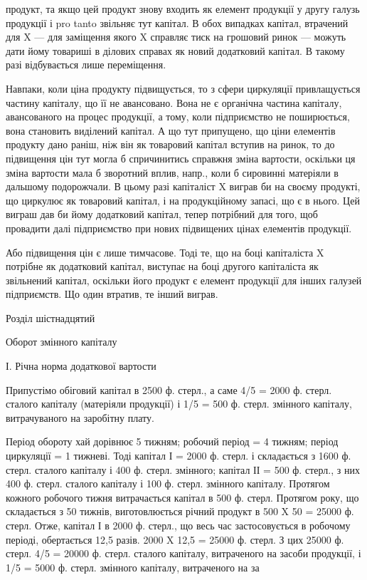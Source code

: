 продукт, та якщо цей продукт знову входить як елемент продукції у
другу галузь продукції і pro tanto звільняє тут капітал. В обох випадках
капітал, втрачений для X — для заміщення якого X справляє тиск на грошовий
ринок — можуть дати йому товариші в ділових справах як новий
додатковий капітал. В такому разі відбувається лише переміщення.

Навпаки, коли ціна продукту підвищується, то з сфери циркуляції
привлащується частину капіталу, що її не авансовано. Вона не є
органічна частина капіталу, авансованого на процес продукції, а тому,
коли підприємство не поширюється, вона становить виділений капітал.
А що тут припущено, що ціни елементів продукту дано раніш, ніж він
як товаровий капітал вступив на ринок, то до підвищення цін тут могла б
спричинитись справжня зміна вартости, оскільки ця зміна вартости мала б
зворотний вплив, напр., коли б сировинні матеріяли в дальшому
подорожчали. В цьому разі капіталіст X виграв би на своєму продукті,
що циркулює як товаровий капітал, і на продукційному запасі, що є в
нього. Цей виграш дав би йому додатковий капітал, тепер потрібний для
того, щоб провадити далі підприємство при нових підвищених цінах елементів
продукції.

Або підвищення цін є лише тимчасове. Тоді те, що на боці капіталіста
X потрібне як додатковий капітал, виступає на боці другого капіталіста
як звільнений капітал, оскільки його продукт є елемент продукції
для інших галузей підприємств. Що один втратив, те інший виграв.

Розділ шістнадцятий

Оборот змінного капіталу

І. Річна норма додаткової вартости

Припустімо обіговий капітал в 2500 ф. стерл., а саме 4/5 = 2000 ф.
стерл. сталого капіталу (матеріяли продукції) і 1/5 = 500 ф. стерл. змінного
капіталу, витрачуваного на заробітну плату.

Період обороту хай дорівнює 5 тижням; робочий період = 4 тижням;
період циркуляції = 1 тижневі. Тоді капітал І = 2000 ф. стерл. і складається
з 1600 ф. стерл. сталого капіталу і 400 ф. стерл. змінного; капітал
ІІ = 500 ф. стерл., з них 400 ф. стерл. сталого капіталу і 100 ф.
стерл. змінного капіталу. Протягом кожного робочого тижня витрачається
капітал в 500 ф. стерл. Протягом року, що складається з 50 тижнів,
виготовлюється річний продукт в 500 X 50 = 25000 ф. стерл. Отже, капітал
І в 2000 ф. стерл., що весь час застосовується в робочому періоді,
обертається 12,5 разів. 2000 X 12,5 = 25000 ф. стерл. З цих 25000 ф.
стерл. 4/5 = 20000 ф. стерл. сталого капіталу, витраченого на засоби
продукції, і 1/5 = 5000 ф. стерл. змінного капіталу, витраченого на за
